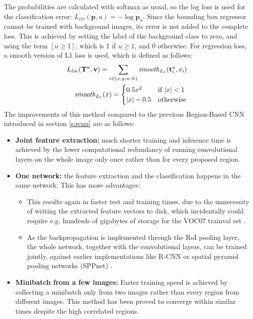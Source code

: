 The probabilities are calculated with softmax as usual, so the log loss is used for the classification error: $L_{cls}(\mathbf{p},u) = -\log \mathbf{p}_u$. Since the bounding box regressor cannot be trained with background images, its error is not added to the complete loss. This is achieved by setting the label of the background class to zero, and using the term $[u \ge 1]$, which is 1 if $u \ge 1$, and 0 otherwise. For regression loss, a smooth version of L1 loss is used, which is defined as follows:
\bigbreak
\begin{align}\label{eq:smoothl1loss}
	L_{loc}(\mathbf{T}^u, \mathbf{v}) = \sum\limits_{i \in (x, y, w, h)} \mathit{smooth}_{L_{1}} (\mathbf{t}_{i}^u, v_i)\\
	\mathit{smooth}_{L_{1}} (x) = \begin{cases}
               0.5 x^2 & \text{if } \lvert x\rvert < 1\\
               \lvert x\rvert-0.5 & \text{otherwise}
            \end{cases}
\end{align}
\bigbreak
The improvements of this method compared to the previous Region-Based CNN introduced in section \ref{s:rcnn} are as follows:
\begin{itemize}
	\item\textbf{Joint feature extraction:} much shorter training and inference time is achieved by the lower computational redundancy of running convolutional layers on the whole image only once rather than for every proposed region.
	\item\textbf{One network:} the feature extraction and the classification happens in the same network. This has more advantages:
	\begin{itemize}
	        \item This results again in faster test and training times, due to the unnecessity of writing the extracted feature vectors to disk, which incidentally could require e.g. hundreds of gigabytes of storage \cite{Girshick:2016:RCN:2881668.2882239} for the VOC07 trainval set \cite{pascal-voc-2007}.
	        \item As the backpropagation is implemented through the RoI pooling layer, the whole network, together with the convolutional layers, can be trained jointly, against earlier implementations like R-CNN \cite{DBLP:journals/corr/GirshickDDM13} or spatial pyramid pooling networks (SPPnet) \cite{DBLP:journals/corr/HeZR014}.
	\end{itemize}
	\item\textbf{Minibatch from a few images:} Faster training speed is achieved by collecting a minibatch only from two images rather than every region from different images. This method has been proved to converge within similar times despite the high correlated regions.
\end{itemize}
